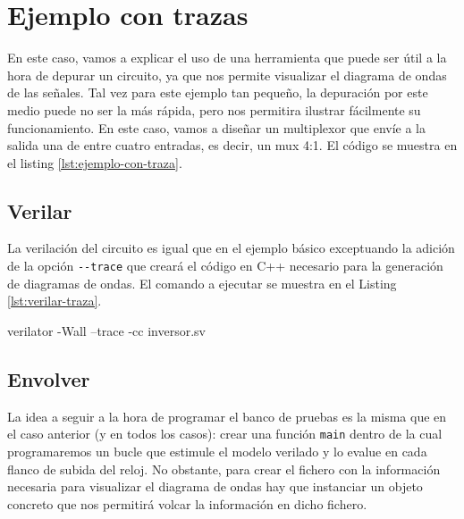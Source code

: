 
\section{Ejemplo con trazas}
En este caso, vamos a explicar el uso de una herramienta que puede ser útil a la hora de depurar un circuito, ya que nos permite visualizar el diagrama de ondas de las señales. Tal vez para este ejemplo tan pequeño, la depuración por este medio puede no ser la más rápida, pero nos permitira ilustrar fácilmente su funcionamiento. En este caso, vamos a diseñar un multiplexor que envíe a la salida una de entre cuatro entradas, es decir, un mux 4:1. El código se muestra en el listing \ref{lst:ejemplo-con-traza}.



\subsection{Verilar}
La verilación del circuito es igual que en el ejemplo básico exceptuando la adición de la opción \verb|--trace| que creará el código en C++ necesario para la generación de diagramas de ondas. El comando a ejecutar se muestra en el Listing \ref{lst:verilar-traza}.

\begin{mycode}[style=bashstyle, label=lst:verilar-traza, caption={Instrucción para verilar el diseño habilitando las trazas.}]
verilator -Wall --trace -cc inversor.sv
\end{mycode}

\subsection{Envolver}
La idea a seguir a la hora de programar el banco de pruebas es la misma que en el caso anterior (y en todos los casos): crear una función \verb|main| dentro de la cual programaremos un bucle que estimule el modelo verilado y lo evalue en cada flanco de subida del reloj. No obstante, para crear el fichero con la información necesaria para visualizar el diagrama de ondas hay que instanciar un objeto concreto que nos permitirá volcar la información en dicho fichero. 

